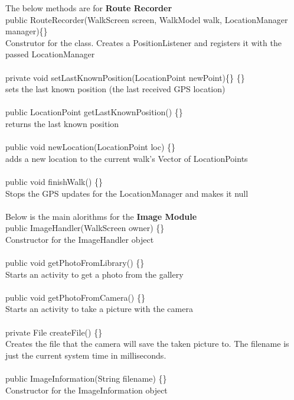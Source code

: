 \documentclass[12pt]{article}
\begin{document}
The below methods are for \textbf{Route Recorder}~\\
public RouteRecorder(WalkScreen screen, WalkModel walk, LocationManager manager)\{\}~\\
Construtor for the class. Creates a PositionListener and registers it with the passed LocationManager~\\\\
private void setLastKnownPosition(LocationPoint newPoint)\{\} \{\}~\\ sets the last known position (the last received GPS location)~\\\\
public LocationPoint getLastKnownPosition() \{\} ~\\
returns the last known position~\\\\
public void newLocation(LocationPoint loc) \{\} ~\\
adds a new location to the current walk's Vector of LocationPoints ~\\\\
public void finishWalk() \{\}~\\
Stops the GPS updates for the LocationManager and makes it null ~\\\\
Below is the main alorithms for the \textbf{Image Module}~\\
public ImageHandler(WalkScreen owner) \{\}~\\
Constructor for the ImageHandler object ~\\\\
public void getPhotoFromLibrary() \{\}~\\
Starts an activity to get a photo from the gallery~\\\\
public void getPhotoFromCamera() \{\}~\\
Starts an activity to take a picture with the camera ~\\\\
private File createFile() \{\} ~\\
Creates the file that the camera will save the taken picture to. The filename is just the current system time in milliseconds. ~\\\\
public ImageInformation(String filename) \{\}~\\
Constructor for the ImageInformation object ~\\\\
\end{document}
